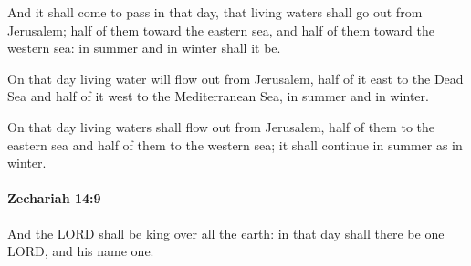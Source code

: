 			\begin{versebox}
					\item[BHS] 
					\item[LXX] 
					\item[ASV] And it shall come to pass in that day, that living waters shall go out from Jerusalem; half of them toward the eastern sea, and half of them toward the western sea: in summer and in winter shall it be.
					\item[NIV] On that day living water will flow out from Jerusalem, half of it east to the Dead Sea and half of it west to the Mediterranean Sea, in summer and in winter.
					\item[NRSV] On that day living waters shall flow out from Jerusalem, half of them to the eastern sea and half of them to the western sea; it shall continue in summer as in winter.
			\end{versebox}

		\paragraph{Zechariah 14:9} %
			\label{ZECHARIAH-14-9}

			And the LORD shall be king over all the earth: in that day shall there be one LORD, and his name one.

